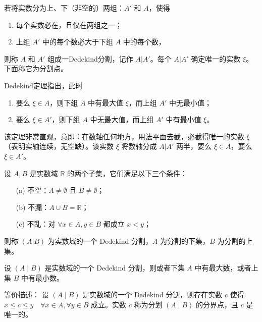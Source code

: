 \begin{theorem*}
    若将实数分为上、下（非空的）两组：\(A'\) 和 \(A\)，使得
    \begin{enumerate}
        \item 每个实数必在，且仅在两组之一；
        \item 上组 \(A'\) 中的每个数必大于下组 \(A\) 中的每个数，
    \end{enumerate}
    则称 \(A\) 和 \(A'\) 组成一Dedekind分割，记作 \(A|A'\)。每个 \(A|A'\) 确定唯一的实数 \(\xi\)。下面称它为分割点。
    
    Dedekind定理指出，此时
    \begin{enumerate}
        \item 要么 \(\xi \in A\)，则下组 \(A\) 中有最大值 \(\xi\)，而上组 \(A'\) 中无最小值；
        \item 要么 \(\xi \in A'\)，则下组 \(A\) 中无最大值，而上组 \(A'\) 中有最小值 \(\xi\)。
    \end{enumerate}
    该定理非常直观，意即：在数轴任何地方，用法平面去截，必截得唯一的实数 \(\xi\)（表明实轴连续，无空缺）。该实数 \(\xi\) 将数轴分成 \(A|A'\) 两半，要么 \(\xi \in A\)，要么 \(\xi \in A'\)。
\end{theorem*}

\begin{definition*}[Dedekind原理]
    设 $A, B$ 是实数域 $\mathbb{R}$ 的两个子集，它们满足以下三个条件：
    
    \begin{enumerate}
    \item[(a)] 不空：$A \neq \emptyset$ 且 $B \neq \emptyset$；
    \item[(b)] 不漏：$A \cup B = \mathbb{R}$；
    \item[(c)] 不乱：对 $\forall x \in A, y \in B$ 都成立 $x < y$；
    \end{enumerate}
    
    则称 $(A|B)$ 为实数域的一个 \textsf{Dedekind} 分割，$A$ 为分割的下集，$B$ 为分割的上集。
\end{definition*}

\begin{theorem*}[Dedekind分割定理]
    设 $(A \mid B)$ 是实数域的一个 \textsf{Dedekind} 分割，则或者下集 $A$ 中有最大数，或者上集 $B$ 中有最小数。

    等价描述：
    设 $(A \mid B)$ 是实数域的一个 \textsf{Dedekind} 分割，则存在实数 $c$ 使得
    $x \leq c \leq y \quad \forall x \in A, \forall y \in B$
    成立。实数 $c$ 称为分划 $(A\mid B)$ 的分界点，且 $c$ 是唯一的。
\end{theorem*}


